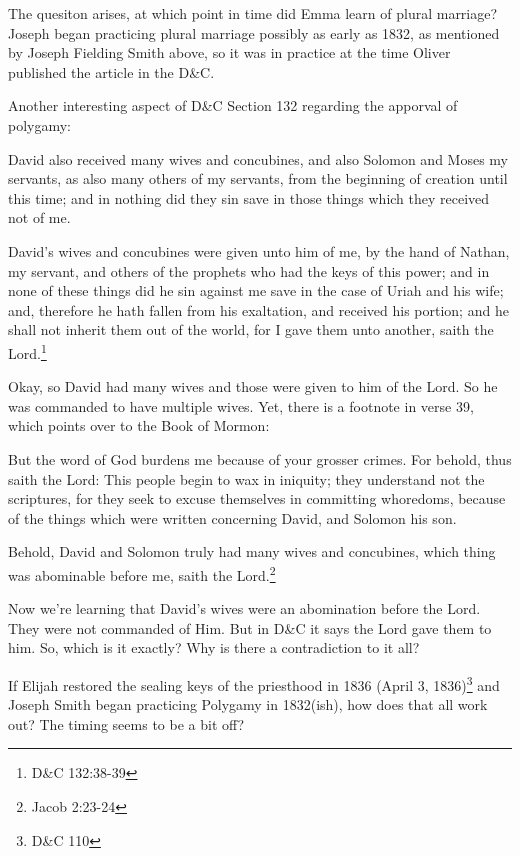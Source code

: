 The quesiton arises, at which point in time did Emma learn of plural marriage? 
Joseph began practicing plural marriage possibly as early as 1832, as mentioned by
Joseph Fielding Smith above, so it was in practice at the time Oliver published the
article in the D\&C.

Another interesting aspect of D\&C Section 132 regarding the apporval of polygamy:

\begin{displayquote}
David also received many wives and concubines, and also Solomon and Moses my 
servants, as also many others of my servants, from the beginning of creation until 
this time; and in nothing did they sin save in those things which they received 
not of me.

David’s wives and concubines were given unto him of me, by the hand of Nathan, 
my servant, and others of the prophets who had the keys of this power; and in none of 
these things did he sin against me save in the case of Uriah and his wife; and, 
therefore he hath fallen from his exaltation, and received his portion; and he 
shall not inherit them out of the world, for I gave them unto another, saith the 
Lord.\footnote{D\&C 132:38-39}
\end{displayquote}

Okay, so David had many wives and those were given to him of the Lord. So he was
commanded to have multiple wives. Yet, there is a footnote in verse 39, which points
over to the Book of Mormon:

\begin{displayquote}
But the word of God burdens me because of your grosser crimes. For behold, 
thus saith the Lord: This people begin to wax in iniquity; they understand not the 
scriptures, for they seek to excuse themselves in committing whoredoms, because of 
the things which were written concerning David, and Solomon his son.

Behold, David and Solomon truly had many wives and concubines, which thing was 
abominable before me, saith the Lord.\footnote{Jacob 2:23-24}
\end{displayquote}

Now we're learning that David's wives were an abomination before the Lord. They were
not commanded of Him. But in D\&C it says the Lord gave them to him. So, which is it
exactly? Why is there a contradiction to it all?

If Elijah restored the sealing keys of the priesthood in 1836 (April 3,
  1836)\footnote{D\&C 110} and Joseph Smith began practicing Polygamy in 1832(ish),
  how does that all work out? The timing seems to be a bit off?


